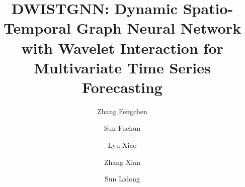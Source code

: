 \documentclass[final,12pt]{elsarticle}
\begin{document}
\begin{frontmatter}

\title{DWISTGNN: Dynamic Spatio-Temporal Graph Neural Network 
with Wavelet Interaction for Multivariate Time Series Forecasting}
\author[NUE]{Zhang Fengchen}
\author[THU]{Sun Fuchun}
\author[NUE]{Lyu Xiao}
\author[NUE]{Zhang Xian}
\author[NUE]{Sun Lidong}


\end{frontmatter}
\end{document}
